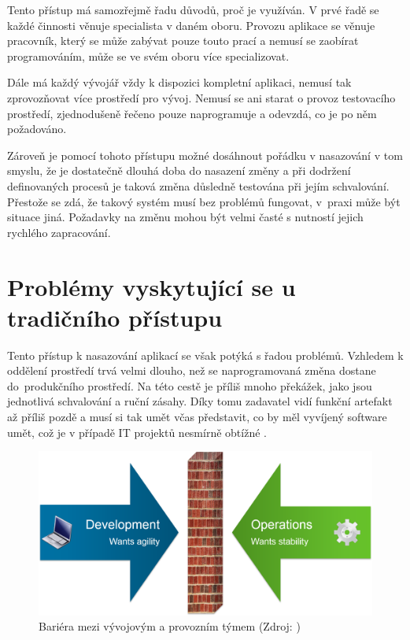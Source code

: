 \documentclass[FM,DP]{tulthesis}
\begin{document}
Tento přístup má samozřejmě řadu důvodů, proč je využíván. V prvé řadě se každé činnosti věnuje
specialista v daném oboru. Provozu aplikace se věnuje pracovník, který se může zabývat pouze
touto prací a nemusí se zaobírat programováním, může se ve svém oboru více specializovat.

Dále má každý vývojář vždy k dispozici kompletní aplikaci, nemusí tak zprovozňovat více prostředí pro 
vývoj. Nemusí se ani starat o provoz testovacího prostředí, zjednodušeně řečeno pouze naprogramuje
a odevzdá, co je po něm požadováno.

Zároveň je pomocí tohoto přístupu možné dosáhnout pořádku v nasazování v tom smyslu, že je dostatečně 
dlouhá doba do nasazení změny a při dodržení definovaných procesů je taková změna důsledně testována
při jejím schvalování. Přestože se zdá, že takový systém musí bez problémů fungovat, v~praxi může být
situace jiná. Požadavky na změnu mohou být velmi časté s nutností jejich rychlého zapracování.


\section{Problémy vyskytující se u tradičního přístupu}

Tento přístup k nasazování aplikací se však potýká s řadou problémů. Vzhledem k oddělení prostředí
trvá velmi dlouho, než se naprogramovaná změna dostane do~produkčního prostředí. Na této cestě
je příliš mnoho překážek, jako jsou jednotlivá schvalování a ruční zásahy. Díky tomu zadavatel vidí
funkční artefakt až příliš pozdě a musí si tak umět včas představit, co by měl vyvíjený software
umět, což je v případě IT projektů nesmírně obtížné \cite[strana~73]{devops}.

\begin{figure}[h]
\center
\includegraphics[width=\textwidth]{devops-wall.png}
\caption{Bariéra mezi vývojovým a provozním týmem (Zdroj: \cite{devops-wall})}
\label{devops-wall}
\end{figure}
\end{document}
